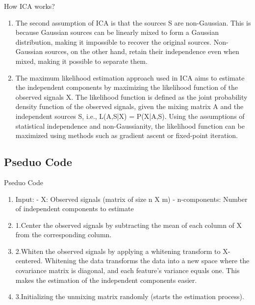 \documentclass{beamer}
\begin{document}
\begin{frame}{How ICA works?}
    \begin{enumerate}
        \item The second assumption of ICA is that the sources S are non-Gaussian. This is because Gaussian sources can be linearly mixed to form a Gaussian distribution, making it impossible to recover the original sources. Non-Gaussian sources, on the other hand, retain their independence even when mixed, making it possible to separate them.
        \item The maximum likelihood estimation approach used in ICA aims to estimate the independent components by maximizing the likelihood function of the observed signals X. The likelihood function is defined as the joint probability density function of the observed signals, given the mixing matrix A and the independent sources S, i.e., L(A,S|X) = P(X|A,S). Using the assumptions of statistical independence and non-Gaussianity, the likelihood function can be maximized using methods such as gradient ascent or fixed-point iteration.
    \end{enumerate}
\end{frame}

\subsection{Pseduo Code}
\begin{frame}{Pseduo Code}
    \begin{enumerate}
        \item Input: \newline
        - X: Observed signals (matrix of size n X m) \newline
        - n-components: Number of independent components to estimate
        \item 1.Center the observed signals by subtracting the mean of each column of X from the corresponding column.
        \item 2.Whiten the observed signals by applying a whitening transform to X-centered. Whitening the data transforms the data into a new space where the covariance matrix is diagonal, and each feature's variance equals one. This makes the estimation of the independent components easier.
        \item 3.Initializing the unmixing matrix randomly (starts the estimation process).
    \end{enumerate}
\end{frame}
\end{document}
